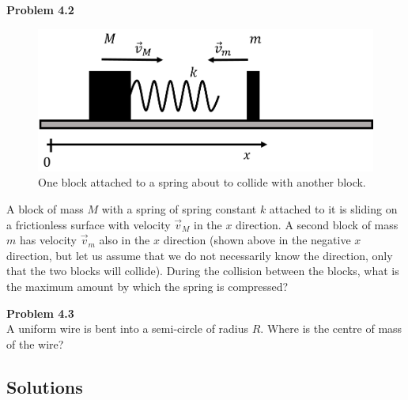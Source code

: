 \documentclass[9pt,arxiv,red]{lapreprint}
\begin{document}
\begin{framed}
\textbf{Problem 4.2}\\
\begin{figure}[!htbp]
\centering
\includegraphics[width=0.6\linewidth]{files/springcollision-e92881ea9bc239e7be1906e3102e5e0c.png}
\caption[]{One block attached to a spring about to collide with another block.}
\label{fig:momentumandcm:springcollision}
\end{figure}

A block of mass $M$ with a spring of spring constant $k$ attached to it is sliding on a frictionless surface with velocity $\vec v_M$ in the $x$ direction. A second block of mass $m$ has velocity $\vec v_m$ also in the $x$ direction (shown above in the negative $x$ direction, but let us assume that we do not necessarily know the direction, only  that the two blocks will collide). During the collision between the blocks, what is the maximum amount by which the spring is compressed?
\end{framed}

\begin{framed}
\textbf{Problem 4.3}\\
A uniform wire is bent into a semi-circle of radius $R$. Where is the centre of mass of the wire?
\end{framed}

\subsection{Solutions}
\end{document}
